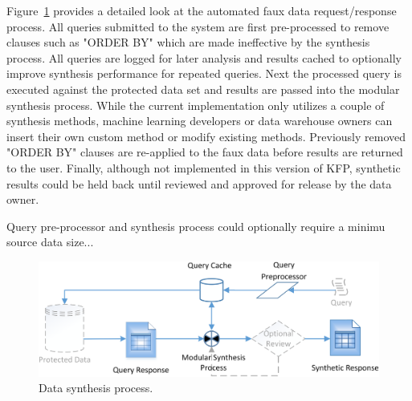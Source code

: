 \documentclass{article}
\begin{document}
Figure~\ref{fig:synthesis_process} provides a detailed look at the automated faux data request/response process. All queries submitted to the system are first pre-processed to remove clauses such as "ORDER BY" which are made ineffective by the synthesis process. All queries are logged for later analysis and results cached to optionally improve synthesis performance for repeated queries. Next the processed query is executed against the protected data set and results are passed into the modular synthesis process. While the current implementation only utilizes a couple of synthesis methods, machine learning developers or data warehouse owners can insert their own custom method or modify existing methods. Previously removed "ORDER BY" clauses are re-applied to the faux data before results are returned to the user. Finally, although not implemented in this version of KFP, synthetic results could be held back until reviewed and approved for release by the data owner.

Query pre-processor and synthesis process could optionally require a minimu source data size...


\begin{figure}[ht]
  \centering
  \includegraphics[width=120mm]{data_synthesis_process}
  \caption{Data synthesis process.}
  \label{fig:synthesis_process}
\end{figure}
\end{document}
